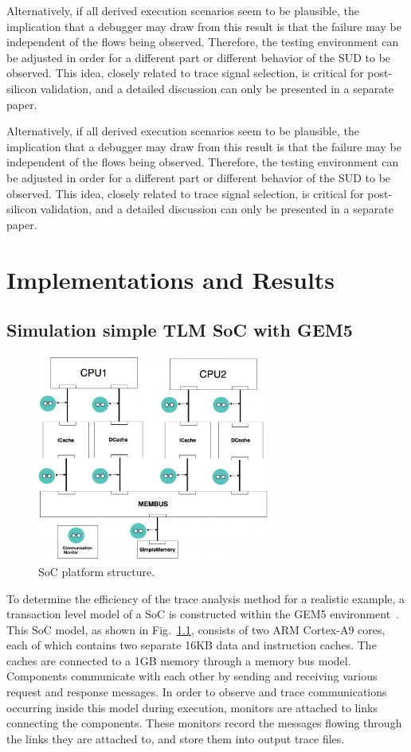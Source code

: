 \documentclass[12pt,frontmatter,copyright,thesis]{usfmanus}
\begin{document}
 Alternatively, if all derived execution scenarios seem to be
 plausible, the implication that a debugger may draw from
 this result is that the failure may be independent of the
 flows being observed.  Therefore, the testing environment
 can be adjusted in order for a different part or different
 behavior of the SUD to be observed.  This idea, closely
 related to trace signal selection, is critical for
 post-silicon validation, and a detailed discussion can only
 be presented in a separate paper.

 Alternatively, if all derived execution scenarios seem to be
 plausible, the implication that a debugger may draw from
 this result is that the failure may be independent of the
 flows being observed.  Therefore, the testing environment
 can be adjusted in order for a different part or different
 behavior of the SUD to be observed.  This idea, closely
 related to trace signal selection, is critical for
 post-silicon validation, and a detailed discussion can only
 be presented in a separate paper.


\chapter{Implementations and Results}

\section{Simulation simple TLM SoC with GEM5}
\begin{figure} 
\centerline{
\includegraphics[width=3in]{figures/Fig4.png}}
\caption{SoC platform structure.}
\label{SoC}
\end{figure}

To determine the efficiency of the trace analysis method for
a realistic example, a transaction level model of a SoC is
constructed within the GEM5 environment~\cite{Binkert2011}.
This SoC model, as shown in Fig.~\ref{SoC}, consists of two
ARM Cortex-A9 cores, each of which contains two separate
16KB data and instruction caches.  The caches are connected
to a 1GB memory through a memory bus model.  Components
communicate with each other by sending and receiving various
request and response messages.  In order to observe and
trace communications occurring inside this model during
execution, monitors are attached to links connecting the
components.  These monitors record the messages flowing
through the links they are attached to, and store them into
output trace files.
\end{document}

